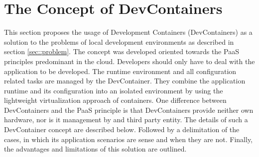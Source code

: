 
\section{The Concept of DevContainers}\label{sec::solution_concept}
This section proposes the usage of Development Containers (DevContainers) as a solution to the problems of local development environments as described in section \ref{sec::problem}. The concept was developed oriented towards the \ac{PaaS} principles predominant in the cloud. Developers should only have to deal with the application to be developed. The runtime environment and all configuration related tasks are managed by the DevContainer. They combine the application runtime and its configuration into an isolated environment by using the lightweight virtualization approach of containers. One difference between DevContainers and the \ac{PaaS} principle is that DevContainers provide neither own hardware, nor is it management by and third party entity.\newline
The details of such a DevContainer concept are described below. Followed by a delimitation of the cases, in which its application scenarios are sense and when they are not. Finally, the advantages and limitations of this solution are outlined.

